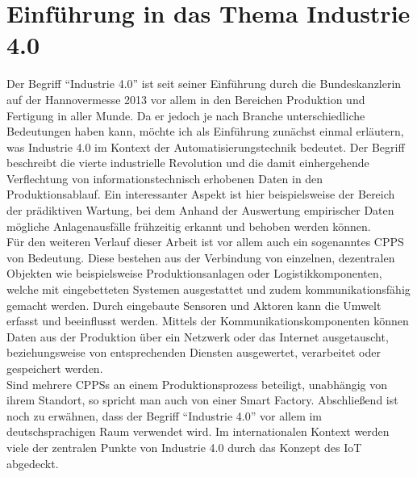 \chapter{Einführung in das Thema Industrie 4.0}

Der Begriff "`Industrie 4.0"' ist seit seiner Einführung durch die Bundeskanzlerin auf der Hannovermesse 2013 vor allem in den Bereichen Produktion und Fertigung in aller Munde. Da er jedoch je nach Branche unterschiedliche Bedeutungen haben kann, möchte ich als Einführung zunächst einmal erläutern, was Industrie 4.0 im Kontext der Automatisierungstechnik bedeutet.
Der Begriff beschreibt die vierte industrielle Revolution und die damit einhergehende Verflechtung von informationstechnisch erhobenen Daten in den Produktionsablauf. Ein interessanter Aspekt ist hier beispielsweise der Bereich der prädiktiven Wartung, bei dem Anhand der Auswertung empirischer Daten mögliche Anlagenausfälle frühzeitig erkannt und behoben werden können.\\
Für den weiteren Verlauf dieser Arbeit ist vor allem auch ein sogenanntes \ac{CPPS} von Bedeutung. Diese bestehen aus der Verbindung von einzelnen, dezentralen Objekten wie beispielsweise Produktionsanlagen oder Logistikkomponenten, welche mit eingebetteten Systemen ausgestattet und zudem kommunikationsfähig gemacht werden. Durch eingebaute Sensoren und Aktoren kann die Umwelt erfasst und beeinflusst werden. Mittels der Kommunikationskomponenten können Daten aus der Produktion über ein Netzwerk oder das Internet ausgetauscht, beziehungsweise von entsprechenden Diensten ausgewertet, verarbeitet oder gespeichert werden.
\cite{Bauerhansl2014}\\
Sind mehrere \aclp{CPPS} an einem Produktionsprozess beteiligt, unabhängig von ihrem Standort, so spricht man auch von einer Smart Factory.
Abschließend ist noch zu erwähnen, dass der Begriff "`Industrie 4.0"' vor allem im deutschsprachigen Raum verwendet wird. Im internationalen Kontext werden viele der zentralen Punkte von Industrie 4.0 durch das Konzept des \ac{IoT} abgedeckt.




